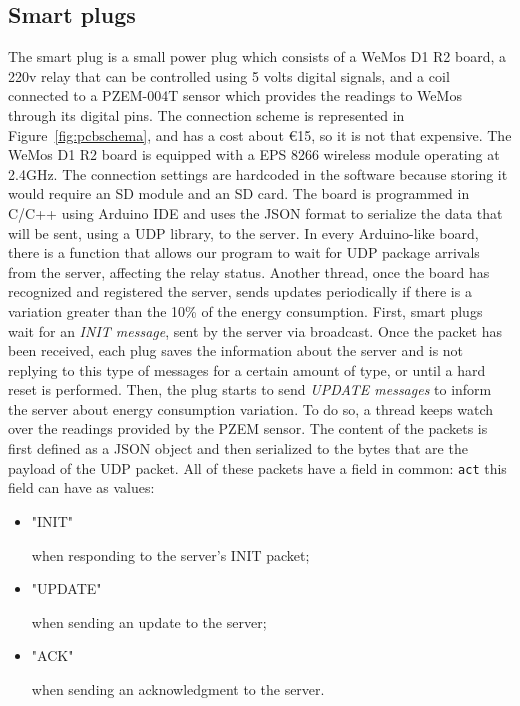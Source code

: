 \documentclass[conference]{IEEEtran}
\begin{document}
\subsection{Smart plugs}\label{SP}
The smart plug is a small power plug which consists of a WeMos D1 R2 board, a 220v relay that can be controlled using 5 volts digital signals, and a coil connected to a PZEM-004T sensor which provides the readings to WeMos through its digital pins.
The connection scheme is represented in Figure~\ref{fig:pcbschema}, and has a cost about €15, so it is not that expensive. 
The WeMos D1 R2 board is equipped with a EPS 8266 wireless module operating at 2.4GHz. The connection settings are hardcoded in the software because storing it would require an SD module and an SD card. The board is programmed in C/C++ using Arduino IDE and uses the JSON format to serialize the data that will be sent, using a UDP library, to the server.
In every Arduino-like board, there is a function that allows our program to wait for UDP package arrivals from the server, affecting the relay status.
Another thread, once the board has recognized and registered the server, sends updates periodically if there is a variation greater than the 10\% of the energy consumption.
First, smart plugs wait for an \textit{INIT message}, sent by the server via broadcast. Once the packet has been received, each plug saves the information about the server and is not replying to this type of messages for a certain amount of type, or until a hard reset is performed. 
Then, the plug starts to send \textit{UPDATE messages} to inform the server about energy consumption variation. To do so, a thread keeps watch over the readings provided by the PZEM sensor.
The content of the packets is first defined as a JSON object and then serialized to the bytes that are the payload of the UDP packet. All of these packets have a field in common: \verb|act| this field can have as values:
\begin{itemize}
	\item \begin{spverbatim}"INIT"\end{spverbatim} when responding to the server's INIT packet;
	\item \begin{spverbatim}"UPDATE"\end{spverbatim} when sending an update to the server;
	\item \begin{spverbatim}"ACK"\end{spverbatim} when sending an acknowledgment to the server.
\end{itemize}
\end{document}
